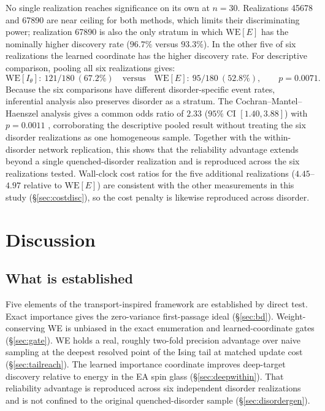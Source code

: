 \documentclass[a4paper,fleqn]{cas-sc}
\newcommand{\WE}{\mathrm{WE}}
\begin{document}
No single realization reaches significance on its own at $n=30$. Realizations 45678 and 67890
are near ceiling for both methods, which limits their discriminating power; realization 67890
is also the only stratum in which $\WE[E]$ has the nominally higher discovery rate ($96.7\%$
versus $93.3\%$). In the other five of six realizations the learned coordinate has the higher
discovery rate. For descriptive comparison, pooling all six realizations gives:
\begin{equation}
\WE[I_\theta]:\ 121/180\ (67.2\%) \quad\text{versus}\quad \WE[E]:\ 95/180\ (52.8\%),
\qquad p=0.0071.
\label{eq:disordergen}
\end{equation}
Because the six comparisons have different disorder-specific event rates, inferential analysis
also preserves disorder as a stratum. The Cochran--Mantel--Haenszel analysis gives a common odds
ratio of $2.33$ ($95\%$ CI $[1.40,3.88]$) with $p=0.0011$ \citep{mantel1959}, corroborating the
descriptive pooled result without treating the six disorder realizations as one homogeneous
sample. Together with the within-disorder network replication, this shows that the reliability
advantage extends beyond a single quenched-disorder realization and is reproduced across the
six realizations tested. Wall-clock cost ratios for the five additional realizations
($4.45$--$4.97$ relative to $\WE[E]$) are consistent with the other measurements in this study
(\S\ref{sec:costdisc}), so the cost penalty is likewise reproduced across disorder.

\FloatBarrier

\section{Discussion}\label{sec:discussion}

\subsection{What is established}\label{sec:established}
Five elements of the transport-inspired framework are established by direct test. Exact
importance gives the zero-variance first-passage ideal (\S\ref{sec:bd}). Weight-conserving WE
is unbiased in the exact enumeration and learned-coordinate gates (\S\ref{sec:gate}). WE holds
a real, roughly two-fold precision advantage over naive sampling at the deepest resolved point
of the Ising tail at matched update cost (\S\ref{sec:tailreach}). The learned importance
coordinate improves deep-target discovery relative to energy in the EA spin glass
(\S\ref{sec:deepwithin}). That reliability advantage is reproduced across six independent
disorder realizations and is not confined to the original quenched-disorder sample
(\S\ref{sec:disordergen}).
\end{document}
